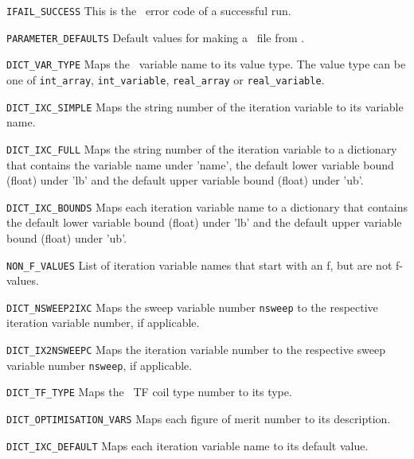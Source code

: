 \begin{description}

\item{\verb|IFAIL_SUCCESS|} This is the \process\ error code of a successful
  run.

\item{\verb|PARAMETER_DEFAULTS|} Default values for making a \plotdat\ file
  from \mfile.

\item{\verb|DICT_VAR_TYPE|} Maps the \process\ variable name to its value
  type. The value type can be one of \verb|int_array|, \verb|int_variable|,
  \verb|real_array| or \verb|real_variable|.

\item{\verb|DICT_IXC_SIMPLE|} Maps the string number of the iteration variable
  to its variable name.

\item{\verb|DICT_IXC_FULL|} Maps the string number of the iteration variable
  to a dictionary that contains the variable name under 'name', the default
  lower variable bound (float) under 'lb' and the default upper variable bound
  (float) under 'ub'.

\item{\verb|DICT_IXC_BOUNDS|} Maps each iteration variable name to a
  dictionary that contains the default lower variable bound (float) under 'lb'
  and the default upper variable bound (float) under 'ub'.

\item{\verb|NON_F_VALUES|} List of iteration variable names that start with an
  f, but are not f-values.

\item{\verb|DICT_NSWEEP2IXC|} Maps the sweep variable number \texttt{nsweep}
  to the respective iteration variable number, if applicable.

\item{\verb|DICT_IX2NSWEEPC|} Maps the iteration variable number to the
  respective sweep variable number \texttt{nsweep}, if applicable.

\item{\verb|DICT_TF_TYPE|} Maps the \process\ TF coil type number to its type.

\item{\verb|DICT_OPTIMISATION_VARS|} Maps each figure of merit number to its
  description.

\item{\verb|DICT_IXC_DEFAULT|} Maps each iteration variable name to its
  default value.

\end{description}

